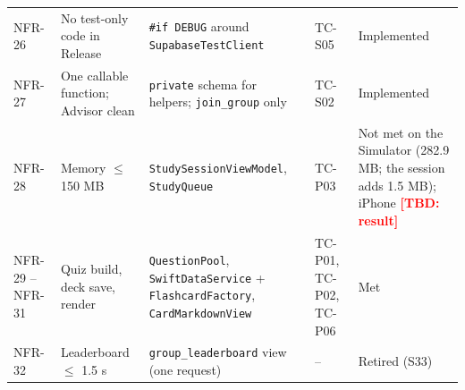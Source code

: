 \documentclass[12pt,letterpaper]{article}
\newcommand{\tbd}[1]{\textcolor{red}{\textbf{[TBD: #1]}}}
\begin{document}
\begin{xltabular}{\textwidth}{@{}l L{3.2cm} Y l L{2.6cm}@{}}
NFR-26 & No test-only code in Release & \texttt{\#if DEBUG} around \texttt{SupabaseTestClient} & TC-S05 & Implemented \\
NFR-27 & One callable function; Advisor clean & \texttt{private} schema for helpers; \texttt{join\_group} only & TC-S02 & Implemented \\
NFR-28 & Memory $\le$ 150 MB & \texttt{StudySessionViewModel}, \texttt{StudyQueue} & TC-P03 & Not met on the Simulator (282.9 MB; the session adds 1.5 MB); iPhone \tbd{result} \\
NFR-29 -- NFR-31 & Quiz build, deck save, render & \texttt{QuestionPool}, \texttt{SwiftDataService} + \texttt{FlashcardFactory}, \texttt{CardMarkdownView} & TC-P01, TC-P02, TC-P06 & Met \\
NFR-32 & Leaderboard $\le$ 1.5 s & \texttt{group\_leaderboard} view (one request) & -- & Retired (S33) \\
\end{xltabular}
\end{document}
